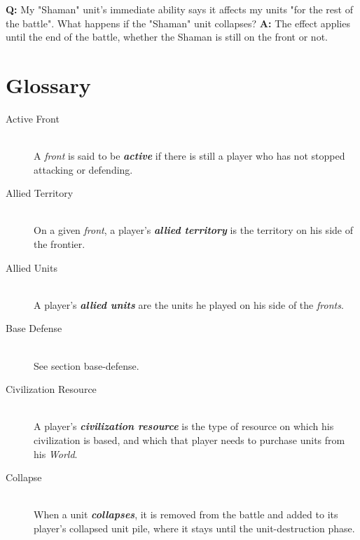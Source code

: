 \documentclass[a4paper]{article}
\begin{document}
    \hspace{-2em}
    \textbf{Q:} My "Shaman" unit's immediate ability says it affects my units
    "for the rest of the battle". What happens if the "Shaman" unit collapses?
    \newline
    \textbf{A:} The effect applies until the end of the battle,
    whether the Shaman is still on the front or not.
    
    
\newpage
\section{Glossary}
  
    \begin{description}
        \item[Active Front] \hfill \\
            A \textit{front} is said to be \textbf{\textit{active}} if there is still a player
            who has not stopped attacking or defending.
            
        \item[Allied Territory] \hfill \\
            On a given \textit{front}, a player's \textbf{\textit{allied territory}}
            is the territory on his side of the frontier.
            
        \item[Allied Units] \hfill \\
            A player's \textbf{\textit{allied units}} are the units he played on his side
            of the \textit{fronts}.
            
        \item[Base Defense] \hfill \\
            See section {base-defense}.
            
        \item[Civilization Resource] \hfill \\
            A player's \textbf{\textit{civilization resource}} is the type of resource
            on which his civilization is based, and which that player needs to purchase
            units from his \textit{World}.
            
        \item[Collapse] \hfill \\
            When a unit \textbf{\textit{collapses}},
            it is removed from the battle and added to its player's collapsed unit pile,
            where it stays until the unit-destruction phase.
            

\end{description}
\end{document}
